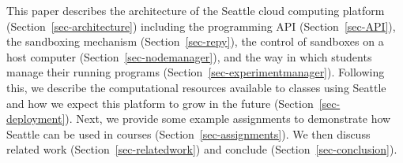 This paper describes the architecture of the Seattle cloud computing
platform (Section~\ref{sec-architecture}) including the
programming API (Section~\ref{sec-API}), 
the sandboxing mechanism (Section~\ref{sec-repy}), 
the control of sandboxes on a
host computer (Section~\ref{sec-nodemanager}), and the way in which
students manage their running programs
(Section~\ref{sec-experimentmanager}). Following this, we describe the
computational resources available to classes using Seattle and how we
expect this platform to grow in the future
(Section~\ref{sec-deployment}).  Next, we provide some example
assignments to demonstrate how Seattle can be used in courses
(Section~\ref{sec-assignments}). We then discuss related work
(Section~\ref{sec-relatedwork}) and conclude
(Section~\ref{sec-conclusion}).



